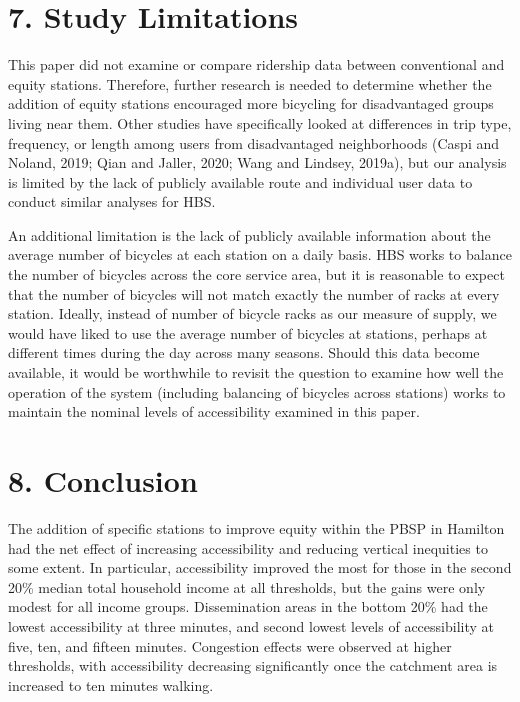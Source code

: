 \documentclass[]{elsarticle} %
\begin{document}
\hypertarget{study-limitations}{%
\section{7. Study Limitations}\label{study-limitations}}

This paper did not examine or compare ridership data between
conventional and equity stations. Therefore, further research is needed
to determine whether the addition of equity stations encouraged more
bicycling for disadvantaged groups living near them. Other studies have
specifically looked at differences in trip type, frequency, or length
among users from disadvantaged neighborhoods (Caspi and Noland, 2019;
Qian and Jaller, 2020; Wang and Lindsey, 2019a), but our analysis is
limited by the lack of publicly available route and individual user data
to conduct similar analyses for HBS.

An additional limitation is the lack of publicly available information
about the average number of bicycles at each station on a daily basis.
HBS works to balance the number of bicycles across the core service
area, but it is reasonable to expect that the number of bicycles will
not match exactly the number of racks at every station. Ideally, instead
of number of bicycle racks as our measure of supply, we would have liked
to use the average number of bicycles at stations, perhaps at different
times during the day across many seasons. Should this data become
available, it would be worthwhile to revisit the question to examine how
well the operation of the system (including balancing of bicycles across
stations) works to maintain the nominal levels of accessibility examined
in this paper.

\hypertarget{conclusion}{%
\section{8. Conclusion}\label{conclusion}}

The addition of specific stations to improve equity within the PBSP in
Hamilton had the net effect of increasing accessibility and reducing
vertical inequities to some extent. In particular, accessibility
improved the most for those in the second 20\% median total household
income at all thresholds, but the gains were only modest for all income
groups. Dissemination areas in the bottom 20\% had the lowest
accessibility at three minutes, and second lowest levels of
accessibility at five, ten, and fifteen minutes. Congestion effects were
observed at higher thresholds, with accessibility decreasing
significantly once the catchment area is increased to ten minutes
walking.
\end{document}
